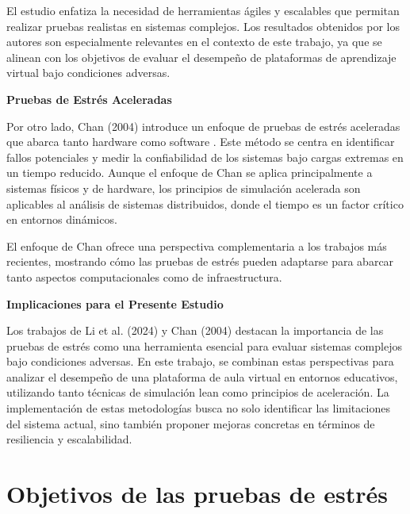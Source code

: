 \documentclass{article}
\begin{document}
El estudio enfatiza la necesidad de herramientas ágiles y escalables que permitan realizar pruebas realistas en sistemas complejos. Los resultados obtenidos por los autores son especialmente relevantes en el contexto de este trabajo, ya que se alinean con los objetivos de evaluar el desempeño de plataformas de aprendizaje virtual bajo condiciones adversas.

\textbf{Pruebas de Estrés Aceleradas}

Por otro lado, Chan (2004) introduce un enfoque de pruebas de estrés aceleradas que abarca tanto hardware como software \cite{Chan2004346}. Este método se centra en identificar fallos potenciales y medir la confiabilidad de los sistemas bajo cargas extremas en un tiempo reducido. Aunque el enfoque de Chan se aplica principalmente a sistemas físicos y de hardware, los principios de simulación acelerada son aplicables al análisis de sistemas distribuidos, donde el tiempo es un factor crítico en entornos dinámicos.

El enfoque de Chan ofrece una perspectiva complementaria a los trabajos más recientes, mostrando cómo las pruebas de estrés pueden adaptarse para abarcar tanto aspectos computacionales como de infraestructura.

\textbf{Implicaciones para el Presente Estudio}

Los trabajos de Li et al. (2024) y Chan (2004) destacan la importancia de las pruebas de estrés como una herramienta esencial para evaluar sistemas complejos bajo condiciones adversas. En este trabajo, se combinan estas perspectivas para analizar el desempeño de una plataforma de aula virtual en entornos educativos, utilizando tanto técnicas de simulación lean como principios de aceleración. La implementación de estas metodologías busca no solo identificar las limitaciones del sistema actual, sino también proponer mejoras concretas en términos de resiliencia y escalabilidad.

\section{Objetivos de las pruebas de estrés}
\end{document}

